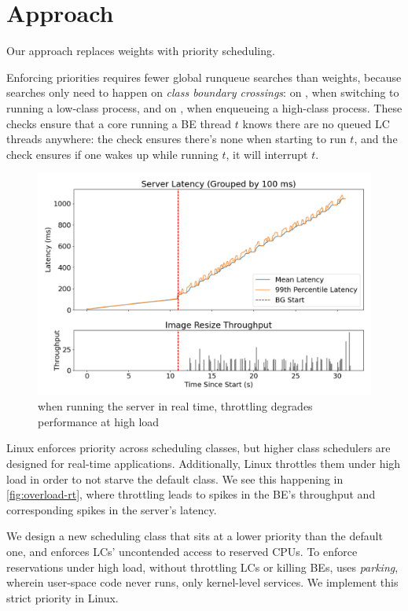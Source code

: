 \section{Approach}

Our approach replaces weights with priority scheduling.

Enforcing priorities requires fewer global runqueue searches than weights,
because searches only need to happen on \textit{class boundary crossings}: on
\exit{}, when switching to running a low-class process, and on \entry{}, when
enqueueing a high-class process. These checks ensure that a core running a BE
thread $t$ knows there are no queued LC threads anywhere: the \exit{} check
ensures there's none when starting to run $t$, and the \entry{} check ensures if
one wakes up while running $t$, it will interrupt $t$.

\begin{figure}[t]
    \centering
    \includegraphics[width=0.9\columnwidth]{graphs/overload-rt.png}
    \caption{when running the server in real time, throttling degrades
    performance at high load}\label{fig:overload-rt}
\end{figure}


Linux enforces priority across scheduling classes, but higher class schedulers
are designed for real-time applications. Additionally, Linux throttles them
under high load in order to not starve the default class. We see this
happening in \autoref{fig:overload-rt}, where throttling leads to spikes in the
BE's throughput and corresponding spikes in the server's latency.

We design a new scheduling class \beclass{} that sits at a lower priority than
the default one, and enforces LCs' uncontended access to reserved CPUs. To
enforce reservations under high load, without throttling LCs or killing BEs,
\beclass{} uses \textit{parking}, wherein user-space code never runs, only
kernel-level services. We implement this strict priority in Linux.